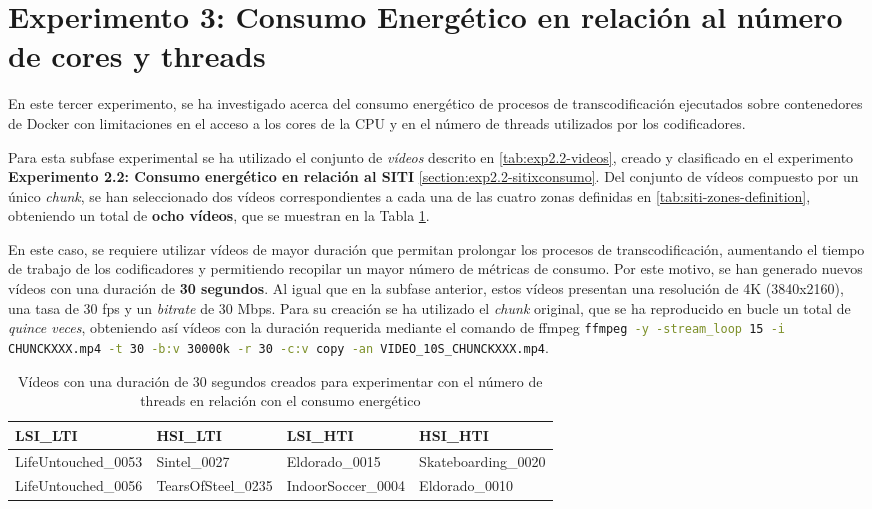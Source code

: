 \section{Experimento 3: Consumo Energético en relación al número de cores y threads}
 En este tercer experimento, se ha investigado acerca del consumo energético de procesos de transcodificación ejecutados sobre contenedores de Docker con limitaciones en el acceso a los cores de la CPU y en el número de threads utilizados por los codificadores.

 Para esta subfase experimental se ha utilizado el conjunto de \textit{vídeos} descrito en \ref{tab:exp2.2-videos}, creado y clasificado en el experimento \textbf{Experimento 2.2: Consumo energético en relación al SITI} \ref{section:exp2.2-sitixconsumo}. Del conjunto de vídeos compuesto por un único \textit{chunk}, se han seleccionado dos vídeos correspondientes a cada una de las cuatro zonas definidas en \ref{tab:siti-zones-definition}, obteniendo un total de \textbf{ocho vídeos}, que se muestran en la Tabla \ref{tab:exp2.3-videos-30s}.

 En este caso, se requiere utilizar vídeos de mayor duración que permitan prolongar los procesos de transcodificación, aumentando el tiempo de trabajo de los codificadores y permitiendo recopilar un mayor número de métricas de consumo. Por este motivo, se han generado nuevos vídeos con una duración de \textbf{30 segundos}. Al igual que en la subfase anterior, estos vídeos presentan una resolución de 4K (3840x2160), una tasa de 30 fps y un \textit{bitrate} de 30 Mbps. Para su creación se ha utilizado el \textit{chunk} original, que se ha reproducido en bucle un total de \textit{quince veces}, obteniendo así vídeos con la duración requerida mediante el comando de ffmpeg \lstinline[language=sh,label={code:exp3-ffmpeg-loop-30s}]{ffmpeg -y -stream_loop 15 -i CHUNCKXXX.mp4 -t 30 -b:v 30000k -r 30 -c:v copy -an VIDEO_10S_CHUNCKXXX.mp4}.

\begin{table}[!ht]

 \centering

 \begin{tabularx}{\textwidth}{|X|X|X|X|}

 \hline

 \rowcolor[HTML]{C0C0C0} 

 LSI\_LTI & HSI\_LTI & LSI\_HTI & HSI\_HTI \\ \hline

 LifeUntouched\_0053 & Sintel\_0027 & Eldorado\_0015 & Skateboarding\_0020 \\ \hline

 LifeUntouched\_0056 & TearsOfSteel\_0235 & IndoorSoccer\_0004 & Eldorado\_0010 \\ \hline

 \end{tabularx}

 \caption{Vídeos con una duración de 30 segundos creados para experimentar con el número de threads en relación con el consumo energético}
 \label{tab:exp2.3-videos-30s}

\end{table}

